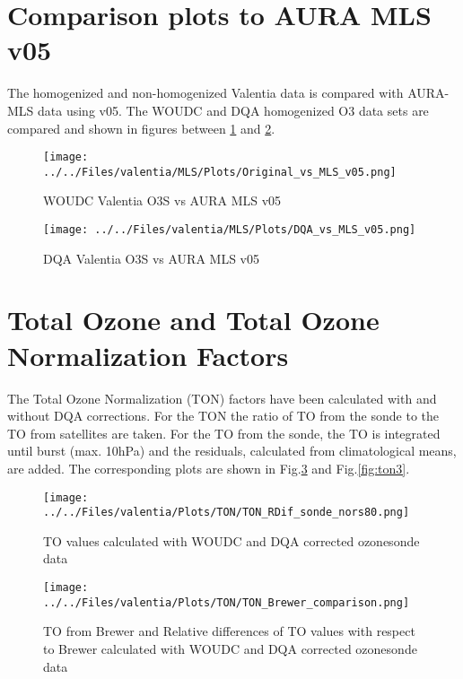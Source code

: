\documentclass{article}
\begin{document}
\section{Comparison plots to AURA MLS v05}

    The homogenized and non-homogenized Valentia data is compared with AURA-MLS data using v05. The
    WOUDC and DQA homogenized O3 data sets are compared and shown in figures between
\ref{fig:niwav05} and \ref{fig:dqav05}.

                                \begin{figure}
        \centering
\texttt{[image: ../../Files/valentia/MLS/Plots/Original\_vs\_MLS\_v05.png]}
    \caption{ WOUDC Valentia O3S vs AURA MLS v05  }
            \label{fig:niwav05}
    \end{figure}

                            \begin{figure}
        \centering
\texttt{[image: ../../Files/valentia/MLS/Plots/DQA\_vs\_MLS\_v05.png]}
    \caption{DQA Valentia O3S vs AURA MLS v05 }
            \label{fig:dqav05}
    \end{figure}

%
        \section{Total Ozone and Total Ozone Normalization Factors}

The Total Ozone Normalization (TON) factors have been calculated with and without DQA corrections. For the TON
the ratio of TO from the sonde to the TO from satellites are taken. For the TO from the sonde, the TO is integrated until
burst (max. 10hPa) and the residuals, calculated from climatological means, are added.
The corresponding plots are shown in Fig.\ref{fig:ton1} and  Fig.\ref{fig:ton3}.

                                \begin{figure}
        \centering
\texttt{[image: ../../Files/valentia/Plots/TON/TON\_RDif\_sonde\_nors80.png]}
    \caption{TO values calculated with WOUDC and DQA corrected ozonesonde data}
            \label{fig:ton1}
    \end{figure}
%
                                 \begin{figure}
        \centering
\texttt{[image: ../../Files/valentia/Plots/TON/TON\_Brewer\_comparison.png]}
    \caption{TO from Brewer and Relative differences of TO values with respect to Brewer calculated with WOUDC
    and DQA corrected ozonesonde data}
            \label{fig:ton2}
    \end{figure}
\end{document}
